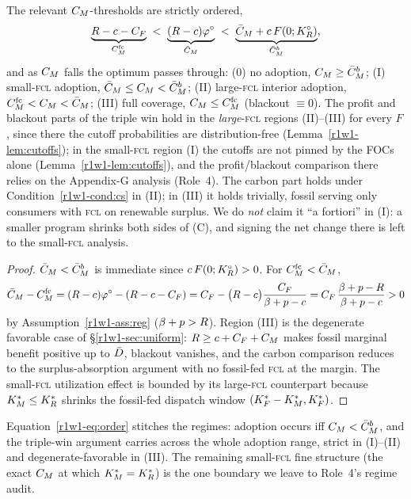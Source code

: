 \begin{proposition}\label{r1w1-prop:regimes}
The relevant $C_M$-thresholds are strictly ordered,
\begin{equation}\label{r1w1-eq:order}
  \underbrace{R-c-C_F}_{C_M^{\mathrm{fc}}}
  \;<\;
  \underbrace{(R-c)\varphi^{\circ}}_{\bar C_M}
  \;<\;
  \underbrace{\bar C_M+c\,F(0;K_R^{\circ})}_{\bar C_M^{b}},
\end{equation}
and as $C_M$ falls the optimum passes through:
\textup{(0)} no adoption, $C_M\ge\bar C_M^{b}$;
\textup{(I)} small-\textsc{fcl} adoption, $\bar C_M\le C_M<\bar C_M^{b}$;
\textup{(II)} large-\textsc{fcl} interior adoption, $C_M^{\mathrm{fc}}<C_M<\bar C_M$;
\textup{(III)} full coverage, $C_M\le C_M^{\mathrm{fc}}$ (blackout $\equiv0$).
The profit and blackout parts of the triple win hold in the
\emph{large}-\textsc{fcl} regions \textup{(II)--(III)} for every $F$, since there
the cutoff probabilities are distribution-free (Lemma~\ref{r1w1-lem:cutoffs}); in the
small-\textsc{fcl} region \textup{(I)} the cutoffs are not pinned by the FOCs alone
(Lemma~\ref{r1w1-lem:cutoffs}), and the profit/blackout comparison there relies on the
Appendix-G analysis (Role~4). The carbon part holds under Condition~\ref{r1w1-cond:cs}
in \textup{(II)}; in \textup{(III)} it holds trivially, fossil serving only
consumers with \textsc{fcl} on renewable surplus. We do \emph{not} claim it
``a fortiori'' in \textup{(I)}: a smaller program shrinks both sides of (C), and
signing the net change there is left to the small-\textsc{fcl} analysis.
\end{proposition}

\begin{proof}
$\bar C_M<\bar C_M^{b}$ is immediate since $c\,F(0;K_R^{\circ})>0$. For
$C_M^{\mathrm{fc}}<\bar C_M$,
\[
  \bar C_M-C_M^{\mathrm{fc}}
  =(R-c)\varphi^{\circ}-(R-c-C_F)
  =C_F-\big(R-c\big)\frac{C_F}{\beta+p-c}
  =C_F\,\frac{\beta+p-R}{\beta+p-c}>0
\]
by Assumption~\ref{r1w1-ass:reg} ($\beta+p>R$). Region (III) is the degenerate
favorable case of \S\ref{r1w1-sec:uniform}: $R\ge c+C_F+C_M$ makes fossil
marginal benefit positive up to $\bar D$, blackout vanishes, and the carbon
comparison reduces to the surplus-absorption argument with no fossil-fed
\textsc{fcl} at the margin. The small-\textsc{fcl} utilization effect is bounded
by its large-\textsc{fcl} counterpart because $K_M^{*}\le K_R^{*}$ shrinks the
fossil-fed dispatch window $(K_F^{*}-K_M^{*},K_F^{*})$.
\end{proof}

\noindent Equation~\eqref{r1w1-eq:order} stitches the regimes: adoption occurs iff
$C_M<\bar C_M^{b}$, and the triple-win argument carries across the whole adoption
range, strict in (I)--(II) and degenerate-favorable in (III). The remaining
small-\textsc{fcl} fine structure (the exact $C_M$ at which $K_M^{*}=K_R^{*}$) is the
one boundary we leave to Role~4's regime audit.

